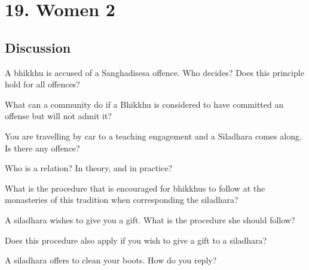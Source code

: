 \chapter{19. Women 2}
\renewcommand*{\theChapterTitle}{19. Women 2}

\section*{Discussion}


A bhikkhu is accused of a Sanghadisesa offence. Who decides? Does this principle hold for all offences?


\bigskip

What can a community do if a Bhikkhu is considered to have committed an offense but will not admit it?


\bigskip


You are travelling by car to a teaching engagement and a Siladhara comes along. Is there any offence?


\bigskip

Who is a relation? In theory, and in practice?


\bigskip

What is the procedure that is encouraged for bhikkhus to follow at the monasteries of this tradition 
when corresponding the siladhara?


\bigskip

A siladhara wishes to give you a gift. What is the procedure she should follow?

\bigskip

Does this procedure also apply if you wish to give a gift to a siladhara?


\bigskip

A siladhara offers to clean your boots. How do you reply?


